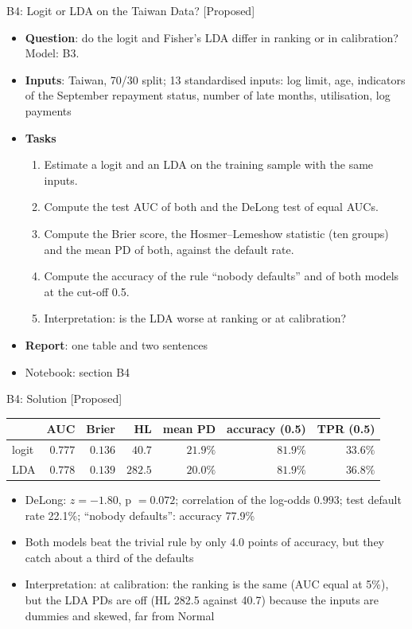 \begin{frame}{B4: Logit or LDA on the Taiwan Data? [Proposed]}
\itemsize{\footnotesize}
\begin{itemize}
\item \textbf{Question}: do the logit and Fisher's LDA differ in ranking or in calibration? Model: B3.
\item \textbf{Inputs}: Taiwan, 70/30 split; 13 standardised inputs: log limit, age, indicators of the September repayment status, number of late months, utilisation, log payments
\item \textbf{Tasks}
\begin{enumerate}
    \item Estimate a logit and an LDA on the training sample with the same inputs.
    \item Compute the test AUC of both and the DeLong test of equal AUCs.
    \item Compute the Brier score, the Hosmer--Lemeshow statistic (ten groups) and the mean PD of both, against the default rate.
    \item Compute the accuracy of the rule ``nobody defaults'' and of both models at the cut-off 0.5.
    \item Interpretation: is the LDA worse at ranking or at calibration?
\end{enumerate}
\item \textbf{Report}: one table and two sentences
\item Notebook: section B4
\end{itemize}
\end{frame}

\ifsolutions
\begin{frame}{B4: Solution [Proposed]}
\itemsize{\footnotesize}
\begin{center}
\scriptsize
\begin{tabular}{lrrrrrr}
\toprule
& AUC & Brier & HL & mean PD & accuracy (0.5) & TPR (0.5) \\
\midrule
logit & $0.777$ & $0.136$ & $40.7$ & $21.9\%$ & $81.9\%$ & $33.6\%$ \\
LDA & $0.778$ & $0.139$ & $282.5$ & $20.0\%$ & $81.9\%$ & $36.8\%$ \\
\bottomrule
\end{tabular}
\end{center}
\begin{itemize}
    \item DeLong: $z = -1.80$, p $= 0.072$; correlation of the log-odds $0.993$; test default rate 22.1\%; ``nobody defaults'': accuracy 77.9\%
    \item Both models beat the trivial rule by only 4.0 points of accuracy, but they catch about a third of the defaults
    \item Interpretation: at calibration: the ranking is the same (AUC equal at 5\%), but the LDA PDs are off (HL 282.5 against 40.7) because the inputs are dummies and skewed, far from Normal
\end{itemize}
\end{frame}
\fi

